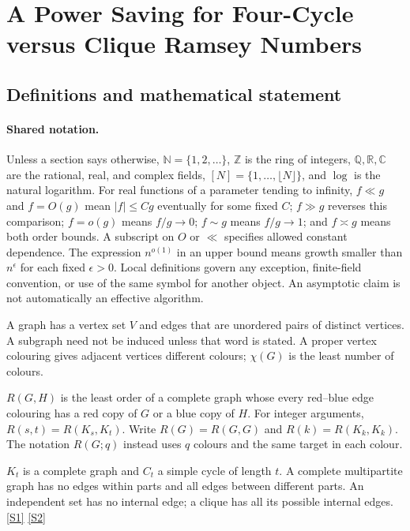\documentclass[11pt,a4paper]{article}
\newcommand{\N}{\mathbb{N}}
\newcommand{\Z}{\mathbb{Z}}
\newcommand{\Q}{\mathbb{Q}}
\newcommand{\R}{\mathbb{R}}
\newcommand{\C}{\mathbb{C}}
\newcommand{\sref}[2]{\hyperlink{source:#1:#2}{[S#2]}}
\begin{document}
\section{A Power Saving for Four-Cycle versus Clique Ramsey Numbers}\label{statement}


\subsection{Definitions and mathematical statement}

\paragraph{Shared notation.}Unless a section says otherwise, $\N=\{1,2,\ldots\}$,
$\Z$ is the ring of integers, $\Q,\R,\C$ are the rational, real, and complex
fields, $[N]=\{1,\ldots,\lfloor N\rfloor\}$, and $\log$ is the natural
logarithm. For real functions of a parameter tending to infinity,
$f\ll g$ and $f=O(g)$ mean $|f|\leq Cg$ eventually for some fixed $C$;
$f\gg g$ reverses this comparison; $f=o(g)$ means $f/g\to0$;
$f\sim g$ means $f/g\to1$; and $f\asymp g$ means both order bounds.
A subscript on $O$ or $\ll$ specifies allowed constant dependence.
The expression $n^{o(1)}$ in an upper bound means growth smaller than
$n^\epsilon$ for each fixed $\epsilon>0$. Local definitions govern any
exception, finite-field convention, or use of the same symbol for another
object. An asymptotic claim is not automatically an effective algorithm.



A graph has a vertex set $V$ and edges that are unordered pairs of distinct vertices. A subgraph need not be induced unless that word is stated. A proper vertex colouring gives adjacent vertices different colours; $\chi(G)$ is the least number of colours.

$R(G,H)$ is the least order of a complete graph whose every red--blue edge colouring has a red copy of $G$ or a blue copy of $H$. For integer arguments, $R(s,t)=R(K_s,K_t)$. Write $R(G)=R(G,G)$ and $R(k)=R(K_k,K_k)$. The notation $R(G;q)$ instead uses $q$ colours and the same target in each colour.

$K_t$ is a complete graph and $C_t$ a simple cycle of length $t$. A complete multipartite graph has no edges within parts and all edges between different parts. An independent set has no internal edge; a clique has all its possible internal edges. \sref{statement}{1} \sref{statement}{2}
\end{document}

